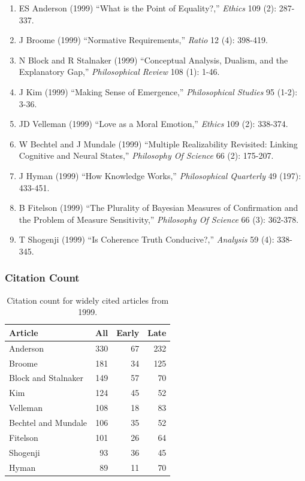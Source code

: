 \documentclass[
  10pt,
  letterpaper,
  DIV=11,
  numbers=noendperiod,
  twoside]{scrartcl}
\providecommand{\tightlist}{%
  \setlength{\itemsep}{0pt}\setlength{\parskip}{0pt}}\usepackage{longtable,booktabs,array}
\begin{document}
\begin{enumerate}
\def\labelenumi{\arabic{enumi}.}
\tightlist
\item
  ES Anderson (1999) ``What is the Point of Equality?,'' \emph{Ethics}
  109 (2): 287-337.
\item
  J Broome (1999) ``Normative Requirements,'' \emph{Ratio} 12 (4):
  398-419.
\item
  N Block and R Stalnaker (1999) ``Conceptual Analysis, Dualism, and the
  Explanatory Gap,'' \emph{Philosophical Review} 108 (1): 1-46.
\item
  J Kim (1999) ``Making Sense of Emergence,'' \emph{Philosophical
  Studies} 95 (1-2): 3-36.
\item
  JD Velleman (1999) ``Love as a Moral Emotion,'' \emph{Ethics} 109 (2):
  338-374.
\item
  W Bechtel and J Mundale (1999) ``Multiple Realizability Revisited:
  Linking Cognitive and Neural States,'' \emph{Philosophy Of Science} 66
  (2): 175-207.
\item
  J Hyman (1999) ``How Knowledge Works,'' \emph{Philosophical Quarterly}
  49 (197): 433-451.
\item
  B Fitelson (1999) ``The Plurality of Bayesian Measures of Confirmation
  and the Problem of Measure Sensitivity,'' \emph{Philosophy Of Science}
  66 (3): 362-378.
\item
  T Shogenji (1999) ``Is Coherence Truth Conducive?,'' \emph{Analysis}
  59 (4): 338-345.
\end{enumerate}

\subsubsection*{Citation Count}\label{sec-count-1999}

\begin{longtable}[]{@{}lrrr@{}}

\caption{\label{tbl-citation-count-1999}Citation count for widely cited
articles from 1999.}

\tabularnewline

\toprule\noalign{}
Article & All & Early & Late \\
\midrule\noalign{}
\endhead
\bottomrule\noalign{}
\endlastfoot
Anderson & 330 & 67 & 232 \\
Broome & 181 & 34 & 125 \\
Block and Stalnaker & 149 & 57 & 70 \\
Kim & 124 & 45 & 52 \\
Velleman & 108 & 18 & 83 \\
Bechtel and Mundale & 106 & 35 & 52 \\
Fitelson & 101 & 26 & 64 \\
Shogenji & 93 & 36 & 45 \\
Hyman & 89 & 11 & 70 \\

\end{longtable}
\end{document}
